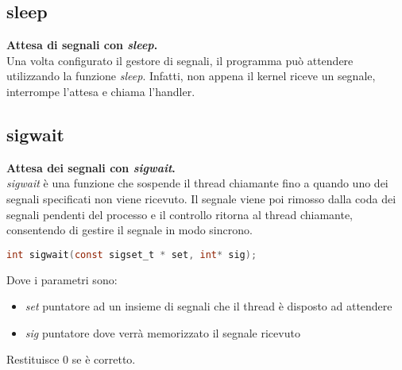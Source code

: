 \subsection{sleep}
\textbf{Attesa di segnali con \textit{sleep}.}\\
Una volta configurato il gestore di segnali, il programma può attendere utilizzando la funzione \textit{sleep}. Infatti, non appena il kernel riceve un segnale, interrompe l'attesa e chiama l'handler.

\subsection{sigwait}
\textbf{Attesa dei segnali con \textit{sigwait}.}\\
\textit{sigwait} è una funzione che sospende il thread chiamante fino a quando uno dei segnali specificati non viene ricevuto. Il segnale viene poi rimosso dalla coda dei segnali pendenti del processo e il controllo ritorna al thread chiamante, consentendo di gestire il segnale in modo sincrono.
\begin{lstlisting}[language=C]
	int sigwait(const sigset_t * set, int* sig);
\end{lstlisting}
Dove i parametri sono:
\begin{itemize}
	\item \textit{set} puntatore ad un insieme di segnali che il thread è disposto ad attendere
	\item \textit{sig} puntatore dove verrà memorizzato il segnale ricevuto
\end{itemize}
Restituisce $0$ se è corretto.
